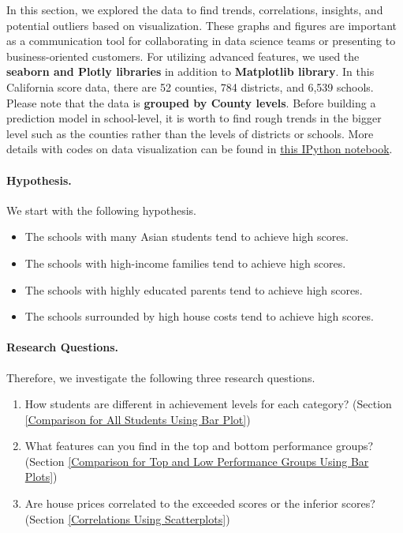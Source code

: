 \documentclass[11pt]{article}
\begin{document}
In this section, we explored the data to find trends, correlations, insights, and potential outliers based on visualization.
These graphs and figures are important as a communication tool
for collaborating in data science teams or 
presenting to business-oriented customers.
%
For utilizing advanced features, we used the \textbf{seaborn and Plotly libraries} in addition to \textbf{Matplotlib library}.
In this California score data, there are 52 counties, 784 districts, and 6,539 schools.
%
Please note that the data is \textbf{grouped by County levels}.
Before building a prediction model in school-level, it is worth to find rough trends in the bigger level such as the counties rather than the levels of districts or schools. 
%
More details with codes on data visualization can be found in
\href{https://github.com/ahrimhan/data-science-project/blob/master/project1/data_visualization.ipynb}{this IPython notebook}. 


\paragraph{Hypothesis.}
We start with the following hypothesis.
\begin{itemize}
\item The schools with many Asian students tend to achieve high scores.
\item The schools with high-income families tend to achieve high scores.
\item The schools with highly educated parents tend to achieve high scores.
\item The schools surrounded by high house costs tend to achieve high scores.
\end{itemize}

\paragraph{Research Questions.}
Therefore, we investigate the following three research questions.
\begin{enumerate}
	\item How students are different in achievement levels for each category? (Section \ref{Comparison for All Students Using Bar Plot})
\item What features can you find in the top and bottom performance groups? (Section \ref{Comparison for Top and Low Performance Groups Using Bar Plots})
\item Are house prices correlated to the exceeded scores or the inferior scores?
(Section \ref{Correlations Using Scatterplots})
\end{enumerate}
\end{document}
